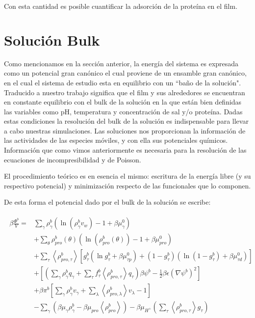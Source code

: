 Con esta cantidad es posible cuantificar la adsorci\'on de la prote\'ina en el film. 

\section{Soluci\'on Bulk}\label{sec:film:bulk-solution}

Como mencionamos en la secci\'on anterior, la energ\'ia del sistema es expresada como un potencial gran can\'onico el cual proviene de un ensamble gran can\'onico, en el cual el sistema de estudio  esta en equilibrio con un ``ba\~no de  la soluci\'on". Traducido a nuestro trabajo significa que el film y sus alrededores se encuentran en constante equilibrio con el bulk de la soluci\'on en la que est\'an bien definidas las variables como pH, temperatura y concentraci\'on de sal y/o prote\'ina. 
Dadas estas condiciones la resoluci\'on del bulk de la soluci\'on es indispensable para llevar a cabo nuestras simulaciones. Las soluciones nos proporcionan la informaci\'on de las actividades de las especies m\'oviles, y con ella sus potenciales qu\'imicos. Informaci\'on que como vimos anteriormente es necesaria para la resolución de las ecuaciones de incompresibilidad y de Poisson.

El procedimiento te\'orico es en esencia el mismo: escritura de la energ\'ia libre (y su respectivo potencial) y minimizaci\'on respecto de las funcionales  que lo componen.

De esta forma el potencial dado por el bulk de la soluci\'on se escribe:

\begin{align}
	\begin{aligned}
		\beta\frac{ \Phi^b}{V}=  & \sum_{\gamma}{\rho^b_\gamma\left(\ln \left(\rho^b_\gamma v_w\right) -1 + \beta\mu^0_\gamma\right)} \\
		&+ \sum_{\theta}{\rho^b_{pro}(\theta)\left(\ln \left(\rho^b_{pro}(\theta)\right) -1 + \beta\mu^0_{pro} \right)} \\
		& + \sum_\tau \left<\rho^b_{pro,\tau}\right> \left[g^b_\tau(\ln g^b_\tau+ \beta\mu^0_{\tau p}) +(1-g^b_\tau)(\ln (1-g^b_\tau)+\beta\mu^0_{\tau d})\right]   \\
		& +\left[\left(\sum_{\gamma } {\rho^b_\gamma q_\gamma + \sum_\tau{f^b_\tau \left<\rho^b_{pro,\tau}\right> q_\tau} }\right)\beta\psi^b -\frac{1}{2}\beta\epsilon(\nabla\psi^b)^2 \right] \\ 
		& +\beta\pi^b{\left[\sum_{\gamma}\rho^b_\gamma v_\gamma + \sum_\lambda{\left<\rho^b_{pro,\lambda}\right>v_\lambda}  -1 \right]} \\
		&   -\sum_\gamma \left(\beta \mu_\gamma \rho^b_\gamma - \beta \mu_{pro} \left<\rho^b_{pro}\right> \right)   -\beta\mu_{H^+} \left( \sum_\tau\left< \rho^b_{pro,\tau} \right>g_\tau  \right )
	\end{aligned}
	\label{eq:film:pot-bulk}
\end{align}

